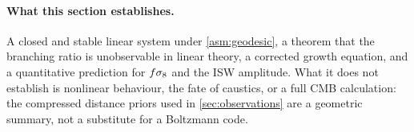 \paragraph{What this section establishes.}
A closed and stable linear system under \cref{asm:geodesic}, a theorem that the
branching ratio is unobservable in linear theory, a corrected growth equation,
and a quantitative prediction for $f\sigma_{8}$ and the ISW amplitude. What it does
not establish is nonlinear behaviour, the fate of caustics, or a full CMB
calculation: the compressed distance priors used in \cref{sec:observations} are
a geometric summary, not a substitute for a Boltzmann code.
